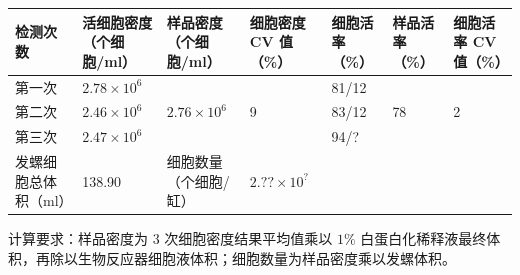 \documentclass[UTF8,10pt,a4paper,fontset=fandol]{ctexart}
\newcommand{\fieldvalue}[1]{#1}
\newcommand{\handwritten}[1]{#1}
\begin{document}
\begin{center}
\small
\begin{tabular}{|p{1.3cm}|p{2.3cm}|p{2.6cm}|p{1.9cm}|p{1.7cm}|p{1.7cm}|p{1.9cm}|}
\hline
检测次数 &
活细胞密度（个细胞/ml） &
样品密度（个细胞/ml） &
细胞密度 CV 值（\%） &
细胞活率（\%） &
样品活率（\%） &
细胞活率 CV 值（\%）\\
\hline
第一次 &
\fieldvalue{\handwritten{$2.78\times10^{6}$}} &
\multirow{3}{*}{
\fieldvalue{\handwritten{$2.76\times10^{6}$}}
} &
\multirow{3}{*}{
\fieldvalue{\handwritten{9}}
} &
\fieldvalue{\handwritten{81/12}} &
\multirow{3}{*}{
\fieldvalue{\handwritten{78}}
} &
\multirow{3}{*}{
\fieldvalue{\handwritten{2}}
}\\
\hline
第二次 &
\fieldvalue{\handwritten{$2.46\times10^{6}$}} &
&
&
\fieldvalue{\handwritten{83/12}} &
&\\
\hline
第三次 &
\fieldvalue{\handwritten{$2.47\times10^{6}$}} &
&
&
\fieldvalue{\handwritten{94/?}} &
&\\
\hline
发螺细胞总体积（ml） &
\fieldvalue{\handwritten{138.90}} &
细胞数量（个细胞/缸） &
\fieldvalue{\handwritten{$2.??\times10^{?}$}} &
\multicolumn{3}{l|}{}\\
\hline
\end{tabular}
\end{center}

\noindent
计算要求：样品密度为 $3$ 次细胞密度结果平均值乘以 $1\%$ 白蛋白化稀释液最终体积，再除以生物反应器细胞液体积；细胞数量为样品密度乘以发螺体积。
\end{document}
